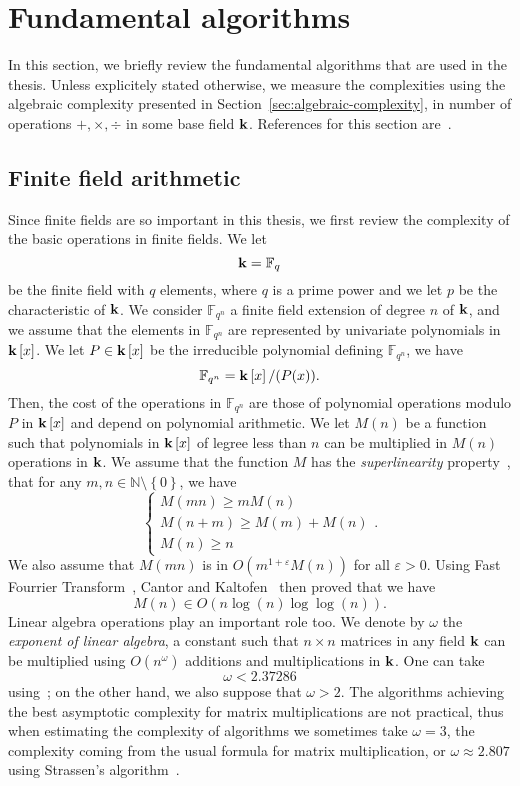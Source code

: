 \section{Fundamental algorithms}

In this section, we briefly review the fundamental algorithms that are used in
the thesis. Unless explicitely stated otherwise, we measure the complexities
using the algebraic complexity presented in
Section~\ref{sec:algebraic-complexity}, \ie in number of operations $+, \times,
\div$ in some base field $\mathbf{k}$. References for this section are~\cite{GG13,
BCGLLSS17, BDDFS17}.

\subsection{Finite field arithmetic}

Since finite fields are so important in this thesis, we first review the
complexity of the basic operations in finite fields. We let
\[
  \mathbf{k} = \mathbb{F}_q
\]
be the finite field with $q$ elements, where $q$ is a prime power and we let $p$
be the characteristic of $\mathbf{k}$. We consider $\mathbb{F}_{q^n}$ a finite field
extension of degree $n$ of $\mathbf{k}$, and we assume that the elements in
$\mathbb{F}_{q^n}$ are represented by univariate polynomials in $\mathbf{k}\left[ x
\right]$. We let $P\in\mathbf{k}\left[ x \right]$ be the irreducible polynomial
defining $\mathbb{F}_{q^n}$, \ie we have
\[
  \mathbb{F}_{q^n} = \mathbf{k}\left[ x \right]/(P(x)).
\]
Then, the cost of the operations in $\mathbb{F}_{q^n}$ are those of polynomial
operations modulo $P$ in $\mathbf{k}\left[ x \right]$ and depend on polynomial
arithmetic. We let $M(n)$ be a function such that polynomials in $\mathbf{k}\left[ x
\right]$ of legree less than $n$ can be multiplied in $M(n)$ operations in $\mathbf{k}$.
We assume that the function $M$ has the \emph{superlinearity}
property~\cite[Chapter 8.3]{GG13}, \ie that for any $m,
n\in\mathbb{N}\setminus\left\{ 0 \right\}$, we have
\[
  \left\{
  \begin{array}{l}
    M(mn) \geq mM(n) \\
    M(n+m)\geq M(m) + M(n) \\
    M(n) \geq n
  \end{array}
  \right.
.\]
We also assume that $M(mn)$ is in $O(m^{1+\varepsilon}M(n))$ for all
$\varepsilon>0$. Using Fast Fourrier Transform~\cite{CT65, SS71}, Cantor and
Kaltofen~\cite{CK91} then proved that we have
\[
  M(n)\in O(n\log(n)\log\log(n)).
\]
Linear algebra operations play an important role too. We denote by $\omega$ the
\emph{exponent of linear algebra}, \ie a constant such that $n\times n$ matrices
in any field $\mathbf{k}$ can be multiplied using $O(n^\omega)$ additions and
multiplications in $\mathbf{k}$. One can take
\[
  \omega < 2.37286
\]
using~\cite{AW21}; on the other hand, we also suppose that $\omega >2$. The
algorithms achieving the best asymptotic complexity for matrix multiplications
are not practical, thus when estimating the complexity of algorithms we
sometimes take $\omega=3$, the complexity coming from the usual formula for
matrix multiplication, or $\omega\approx 2.807$ using Strassen's
algorithm~\cite{Strassen69}.

